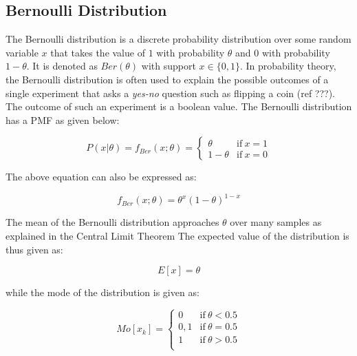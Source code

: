 \subsection{Bernoulli Distribution}
\label{sec:probability:probability_distributions:bernoulli}

The Bernoulli distribution is a discrete probability distribution over some random variable $x$ that takes the value of $1$ with probability $\theta$ and $0$ with probability $1-\theta$. It is denoted as $Ber(\theta)$ with support $x \in \{0, 1\}$. In probability theory, the Bernoulli distribution is often used to explain the possible outcomes of a single experiment that asks a \textit{yes-no} question such as flipping a coin (ref ???). The outcome of such an experiment is a boolean value. The Bernoulli distribution has a PMF as given below:

\begin{equation}
P(x | \theta) = f_{Ber}(x; \theta) =
	\begin{cases}
		\theta & \text{if}\ x=1 \\
      	1 - \theta & \text{if}\ x=0
	\end{cases}
\end{equation}

The above equation can also be expressed as:

\begin{equation}
f_{Ber}(x; \theta) = \theta^{x}(1-\theta)^{1-x}
\end{equation}

The mean of the Bernoulli distribution approaches $\theta$ over many samples as
explained in the Central Limit Theorem The expected value of the distribution is thus given as:

\begin{equation}
E[x] = \theta
\end{equation}

while the mode of the distribution is given as:

\begin{equation}
Mo[x_{k}] = 
\begin{cases}
	0 & \text{if}\ \theta < 0.5 \\
    	0,1 & \text{if}\ \theta = 0.5 \\
    	1 & \text{if}\ \theta > 0.5 \\
\end{cases}
\end{equation}




